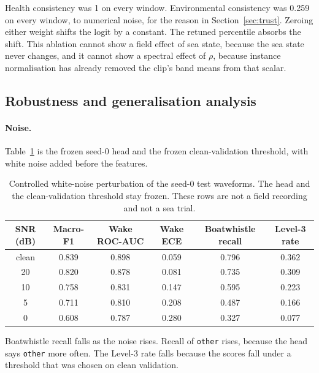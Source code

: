 \documentclass[sn-mathphys-num]{sn-jnl}%
\theoremstyle{thmstyleone}%
\theoremstyle{thmstyletwo}%
\theoremstyle{thmstylethree}%
\begin{document}
Health consistency was 1 on every window. Environmental consistency was 0.259 on every window, to numerical noise, for the reason in Section~\ref{sec:trust}. Zeroing either weight shifts the logit by a constant. The retuned percentile absorbs the shift. This ablation cannot show a field effect of sea state, because the sea state never changes, and it cannot show a spectral effect of $\rho$, because instance normalisation has already removed the clip's band means from that scalar.

\subsection{Robustness and generalisation analysis}\label{sec:robust}

\paragraph{Noise.}
Table~\ref{tab:snr} is the frozen seed-0 head and the frozen clean-validation threshold, with white noise added before the features.

\begin{table}[!htbp]
\centering
\caption{Controlled white-noise perturbation of the seed-0 test waveforms. The head and the clean-validation threshold stay frozen. These rows are not a field recording and not a sea trial.}
\label{tab:snr}
\begin{tabular}{|c|c|c|c|c|c|}
\hline
\textbf{SNR (dB)} & \textbf{Macro-F1} & \textbf{Wake ROC-AUC} & \textbf{Wake ECE} & \textbf{Boatwhistle recall} & \textbf{Level-3 rate} \\
\hline
clean & 0.839 & 0.898 & 0.059 & 0.796 & 0.362 \\
\hline
20 & 0.820 & 0.878 & 0.081 & 0.735 & 0.309 \\
\hline
10 & 0.758 & 0.831 & 0.147 & 0.595 & 0.223 \\
\hline
5 & 0.711 & 0.810 & 0.208 & 0.487 & 0.166 \\
\hline
0 & 0.608 & 0.787 & 0.280 & 0.327 & 0.077 \\
\hline
\end{tabular}
\end{table}

Boatwhistle recall falls as the noise rises. Recall of \texttt{other} rises, because the head says \texttt{other} more often. The Level-3 rate falls because the scores fall under a threshold that was chosen on clean validation.
\end{document}
